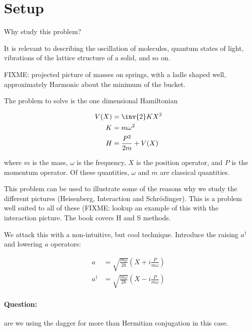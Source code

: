 %
%

\section{Setup}
Why study this problem?

It is relevant to describing the oscillation of molecules, quantum states of light, vibrations of the lattice structure of a solid, and so on.

FIXME: projected picture of masses on springs, with a ladle shaped well, approximately Harmonic about the minimum of the bucket.

The problem to solve is the one dimensional Hamiltonian

\begin{align}\label{eqn:PHY356FLecture11:10}
V(X) &= \inv{2} K X^2 \\
K &= m \omega^2 \\
H &= \frac{P^2}{2m} + V(X)
\end{align}

where $m$ is the mass, $\omega$ is the frequency, $X$ is the position operator, and $P$ is the momentum operator.  Of these quantities, $\omega$ and $m$ are classical quantities.

This problem can be used to illustrate some of the reasons why we study the different pictures (Heisenberg, Interaction and Schr\"{o}dinger).  This is a problem well suited to all of these (FIXME: lookup an example of this with the interaction picture.  The book covers H and S methods.

We attack this with a non-intuitive, but cool technique.  Introduce the raising $a^\dagger$ and lowering $a$ operators:

\begin{align}\label{eqn:PHY356FLecture11:20}
a &= \sqrt{\frac{m \omega}{2 \hbar}} \left( X + i \frac{P}{m\omega} \right) \\
a^\dagger &= \sqrt{\frac{m \omega}{2 \hbar}} \left( X - i \frac{P}{m\omega} \right)
\end{align}

\paragraph{Question:} are we using the dagger for more than Hermitian conjugation in this case.
